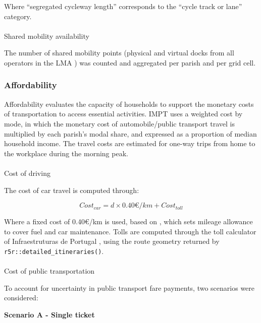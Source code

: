 \documentclass[
  authoryear,
  review,
  1p]{elsarticle}
\makeatletter
\let\oldparagraph\paragraph
\renewcommand{\paragraph}{
    \@ifstar
      \xxxParagraphStar
      \xxxParagraphNoStar
  }
\newcommand{\xxxParagraphStar}[1]{\oldparagraph*{#1}\mbox{}}
\newcommand{\xxxParagraphNoStar}[1]{\oldparagraph{#1}\mbox{}}
\makeatother
\begin{document}
Where ``segregated cycleway length'' corresponds to the ``cycle track or
lane'' category.

\paragraph{Shared mobility
availability}\label{shared-mobility-availability}

The number of shared mobility points (physical and virtual docks from
all operators in the LMA \citep{pmmus}) was counted and aggregated per
parish and per grid cell.

\subsubsection{Affordability}\label{sec-MET_affordability}

Affordability evaluates the capacity of households to support the
monetary costs of transportation to access essential activities. IMPT
uses a weighted cost by mode, in which the monetary cost of
automobile/public transport travel is multiplied by each parish's modal
share, and expressed as a proportion of median household income. The
travel costs are estimated for one-way trips from home to the workplace
during the morning peak.

\paragraph{Cost of driving}\label{sec-MET_cost_driving}

The cost of car travel is computed through:

\[ Cost_{car} = d \times 0.40€/km + Cost_{toll}\]

Where a fixed cost of 0.40€/km is used, based on
\citet{Portaria1553D2008}, which sets mileage allowance to cover fuel
and car maintenance. Tolls are computed through the toll calculator of
Infraestruturas de Portugal \citep{ip_portagens}, using the route
geometry returned by \texttt{r5r::detailed\_itineraries()}.

\paragraph{Cost of public transportation}\label{sec-MET_cost_PT}

To account for uncertainty in public transport fare payments, two
scenarios were considered:

\textbf{Scenario A - Single ticket}
\end{document}
